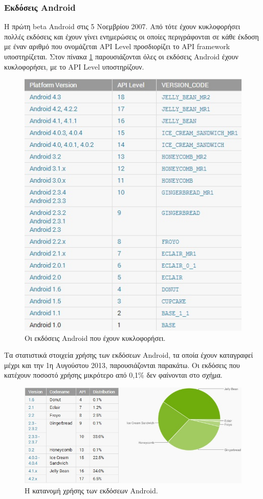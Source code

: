 \documentclass[12pt,twoside,openright]{report}
\begin{document}
\subsubsection{Εκδόσεις \lt Android\gt}
Η πρώτη \lt beta  \lt Android  στις 5 Νοεμβρίου 2007. Από τότε έχουν κυκλοφορήσει πολλές εκδόσεις και έχουν γίνει ενημερώσεις οι οποίες περιγράφονται σε κάθε έκδοση με έναν αριθμό  που ονομάζεται \lt API Level  προσδιορίζει το \lt API framework  υποστηρίζεται. Στον πίνακα \ref{fig:androidVer} παρουσιάζονται όλες οι εκδόσεις \lt Android  έχουν κυκλοφορήσει, με το  \lt API Level  υποστηρίζουν\cite{android_versions}.
\begin{figure}[H]
\centering
\includegraphics{images/android_versions}
\caption{Οι εκδόσεις \lt Android \gt που έχουν κυκλοφορήσει.}
\label{fig:androidVer}
\end{figure}
Τα στατιστικά στοιχεία χρήσης των εκδόσεων \lt Android\gt, τα οποία έχουν καταγραφεί μέχρι και την 1η Αυγούστου 2013, παρουσιάζονται παρακάτω. Οι εκδόσεις που κατέχουν ποσοστό χρήσης μικρότερο από 0,1\% δεν φαίνονται στο σχήμα.
\begin{figure}[H]
\centering
\includegraphics{images/distribution}
\caption{Η κατανομή χρήσης των εκδόσεων \lt Android.\gt}
\end{figure}
\end{document}
